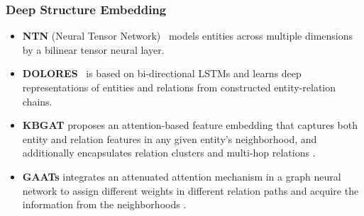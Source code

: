 \documentclass[11pt]{article}
\begin{document}
\newcommand{\norm}[1]{\left\lVert#1\right\rVert}
\begin{table*}[htbp]
\centering
{}
\caption{The score functions  of shallow structure embedding models for KG embedding, where  denotes the generalized dot product,  denotes the Hadamard product,  denotes activation function and  denotes 2D convolution.  denotes conjugate for complex vectors, and 2D reshaping for real vectors in the ConvE model.  denotes the reflection matrix induced by rotation parameters .  is Möbius addition that provides an analogue to Euclidean addition for hyperbolic space.
\label{tab:structure_methods}}
\end{table*}

\subsubsection{Deep Structure Embedding}
\begin{itemize}[leftmargin=*]
\item {\bf NTN} (Neural Tensor Network)~\cite{KB_NL_1} models entities across multiple dimensions by a bilinear tensor neural layer.

\item {\bf DOLORES}~\cite{wang_dolores:_2018} is based on bi-directional LSTMs and learns deep representations of entities and relations from constructed entity-relation chains.

\item {\bf KBGAT} proposes an attention-based feature embedding that captures both entity and relation features in any given entity’s neighborhood, and additionally encapsulates relation clusters and multi-hop relations \cite{nathani-etal-2019-learning}.

\item {\bf GAATs} integrates an attenuated attention mechanism in a graph neural network to assign different weights in different relation paths and acquire the information from the neighborhoods \cite{wang_knowledge_2020}. 
\end{itemize}
\end{document}
